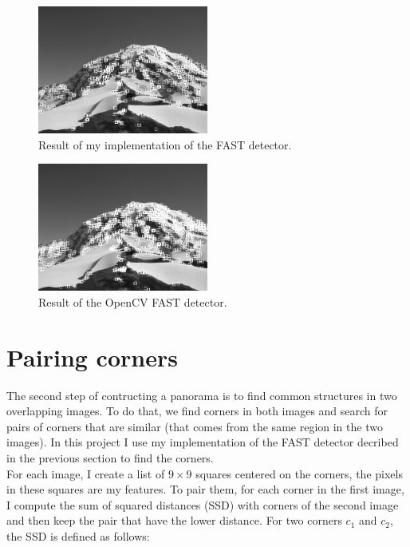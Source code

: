 \documentclass[a4paper,twocolumn]{article}
\begin{document}
\begin{figure}[h]
	\centering\includegraphics[width=0.5\textwidth]{images/my_fast.png}
	\caption{Result of my implementation of the FAST detector.}
	\label{my_fast}
\end{figure}

\begin{figure}[h]
	\centering\includegraphics[width=0.5\textwidth]{images/opencv_fast.png}
	\caption{Result of the OpenCV FAST detector.}
	\label{opencv_fast}
\end{figure}

\section{Pairing corners}

The second step of contructing a panorama is to find common structures in two overlapping images. To do that, we find corners in both images and search for pairs of corners that are similar (that comes from the same region in the two images). In this project I use my implementation of the FAST detector decribed in the previous section to find the corners.
\\

For each image, I create a list of $9 \times 9$ squares centered on the corners, the pixels in these squares are my features. To pair them, for each corner in the first image, I compute the sum of squared distances (SSD) with corners of the second image and then keep the pair that have the lower distance. For two corners $c_1$ and $c_2$, the SSD is defined as follows:
\end{document}
